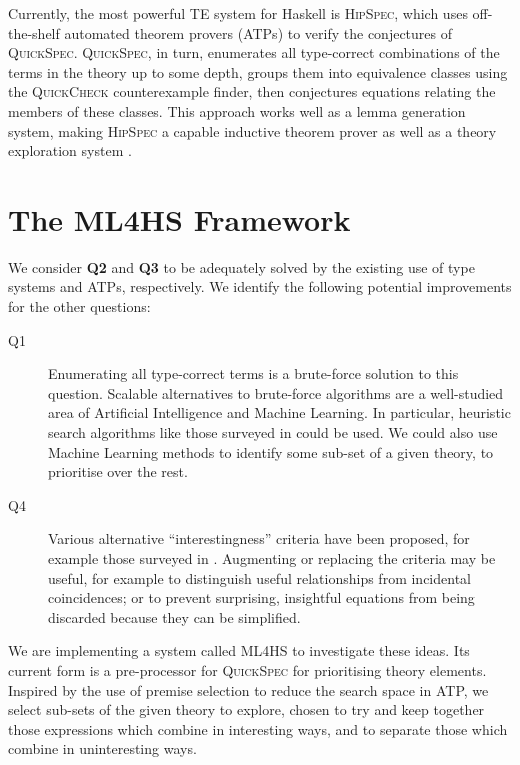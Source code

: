 \documentclass[]{article}
\begin{document}
Currently, the most powerful TE system for Haskell is \textsc{HipSpec}, which
uses off-the-shelf automated theorem provers (ATPs) to verify the conjectures of
\textsc{QuickSpec}. \textsc{QuickSpec}, in turn, enumerates all type-correct combinations
of the terms in the theory up to some depth, groups them into equivalence
classes using the \textsc{QuickCheck} counterexample finder, then conjectures
equations relating the members of these classes. This approach works well as a
lemma generation system, making \textsc{HipSpec} a capable inductive theorem
prover as well as a theory exploration system \cite{claessen2013automating}.

\section{The \textsc{ML4HS} Framework}\label{ml4hs}

We consider \textbf{Q2} and \textbf{Q3} to be adequately solved by the existing
use of type systems and ATPs, respectively. We identify the following potential
improvements for the other questions:

\begin{description}
\item [Q1]
  Enumerating all type-correct terms is a brute-force solution to this question.
  Scalable alternatives to brute-force algorithms are a well-studied area of
  Artificial Intelligence and Machine Learning. In particular, heuristic
  search algorithms like those surveyed in \cite{blum2011hybrid} could be used.
  We could also use Machine Learning methods to identify some sub-set of a given
  theory, to prioritise over the rest.
\item [Q4]
  Various alternative ``interestingness'' criteria have been proposed, for
  example those surveyed in \cite{geng2006interestingness}. Augmenting or
  replacing the criteria may be useful, for example to distinguish useful
  relationships from incidental coincidences; or to prevent surprising,
  insightful equations from being discarded because they can be simplified.
\end{description}

We are implementing a system called \textsc{ML4HS} to investigate these ideas.
Its current form is a pre-processor for \textsc{QuickSpec} for prioritising
theory elements. Inspired by the use of premise selection
\cite{kuhlwein2012overview} to reduce the search space in ATP,
we select sub-sets of the given theory to explore, chosen to try and keep
together those expressions which combine in interesting ways, and to separate
those which combine in uninteresting ways.
\end{document}
